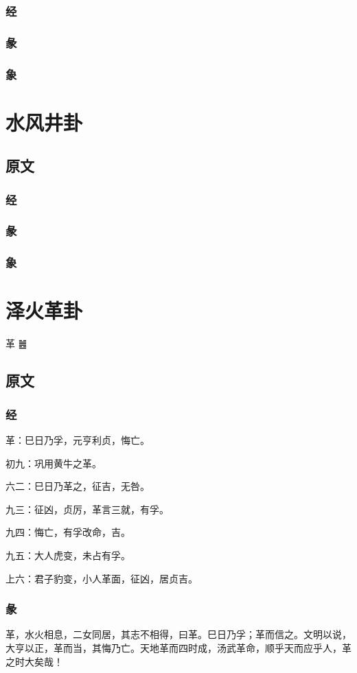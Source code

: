 \documentclass[12pt,oneside]{book}
\begin{document}
\subsection{经}
\subsection{彖}
\subsection{象}

\chapter{水风井卦}
\section{原文}
\subsection{经}
\subsection{彖}
\subsection{象}

\chapter{泽火革卦}
革 {\Large ䷰}
\section{原文}

\subsection{经}
革：巳日乃孚，元亨利贞，悔亡。

初九：巩用黄牛之革。

六二：巳日乃革之，征吉，无咎。

九三：征凶，贞厉，革言三就，有孚。

九四：悔亡，有孚改命，吉。

九五：大人虎变，未占有孚。

上六：君子豹变，小人革面，征凶，居贞吉。

\subsection{彖}
革，水火相息，二女同居，其志不相得，曰革。巳日乃孚；革而信之。文明以说，大亨以正，革而当，其悔乃亡。天地革而四时成，汤武革命，顺乎天而应乎人，革之时大矣哉！
\end{document}
